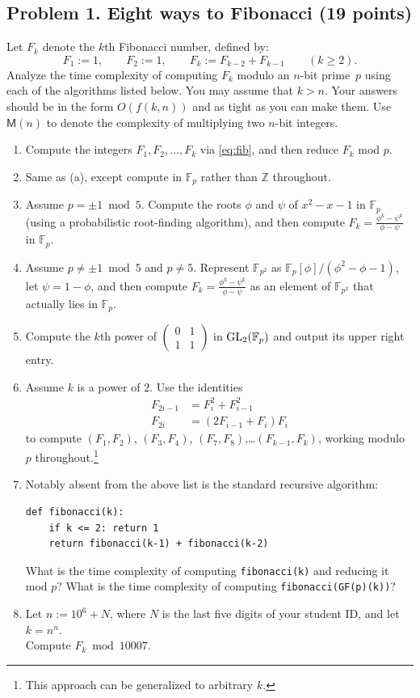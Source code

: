 \documentclass[11pt]{article}
\newcommand{\Fp}{\mathbb{F}_p}
\newcommand{\FF}{\mathbb{F}}
\newcommand{\Z}{\mathbb{Z}}
\begin{document}
\subsection*{Problem 1. Eight ways to Fibonacci (19 points)}
Let $F_k$ denote the $k$th Fibonacci number, defined by:
\begin{equation}\label{eq:fib}
F_1:=1,\qquad F_2:=1,\qquad F_{k}:=F_{k-2}+F_{k-1}\qquad(k\ge 2).
\end{equation}
Analyze the time complexity of computing $F_k$ modulo an $n$-bit prime~$p$ using each of the algorithms listed below.
You may assume that $k>n$.
Your answers should be in the form $O(f(k,n))$ and as tight as you can make them.
Use $\textsf{M}(n)$ to denote the complexity of multiplying two $n$-bit integers.
\begin{enumerate}[{\bf (a)}]
\item Compute the integers $F_1,F_2,\ldots, F_k$ via \eqref{eq:fib}, and then reduce $F_k$ mod $p$.
\item Same as (a), except compute in $\Fp$ rather than $\Z$ throughout.
\item Assume $p=\pm 1\bmod 5$.  Compute the roots $\phi$ and $\psi$ of $x^2-x-1$ in $\Fp$ (using a probabilistic root-finding algorithm), and then compute
$F_k=\frac{\phi^k-\psi^k}{\phi-\psi}$ in $\Fp$.
\item Assume $p\ne\pm 1\bmod 5$ and $p\ne 5$.  Represent $\FF_{p^2}$ as $\Fp[\phi]/(\phi^2-\phi-1)$, let $\psi=1-\phi$, and then compute $F_k=\frac{\phi^k-\psi^k}{\phi-\psi}$ as an element of $\FF_{p^2}$ that actually lies in $\Fp$.
\item Compute the $k$th power of $\begin{pmatrix}0&1\\1&1\end{pmatrix}$ in ${\rm GL}_2(\Fp)$ and output its upper right entry.
\item Assume $k$ is a power of 2.  Use the identities
\begin{align*}
F_{2i-1} &= F_i^2+F_{i-1}^2\\
F_{2i} &= (2F_{i-1}+F_i)F_i
\end{align*}
to compute $(F_1,F_2)$, $(F_3,F_4)$, $(F_7,F_8)$,\ldots $(F_{k-1},F_k)$, working modulo $p$ throughout.\footnote{This approach can be generalized to arbitrary $k$.}
\item
Notably absent from the above list is the standard recursive algorithm:
\begin{lstlisting}
def fibonacci(k):
    if k <= 2: return 1
    return fibonacci(k-1) + fibonacci(k-2)
\end{lstlisting}
What is the time complexity of computing \texttt{fibonacci(k)} and reducing it mod $p$?
What is the time complexity of computing \texttt{fibonacci(GF(p)(k))}?
\item Let $n:=10^6+N$, where $N$ is the last five digits of your student ID, and let $k=n^n$.\\  Compute $F_k\bmod 10007$.
\end{enumerate}
\end{document}
